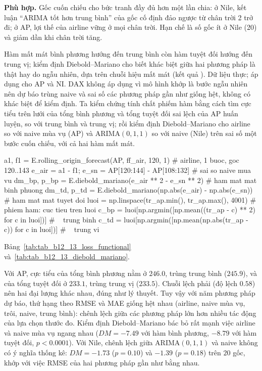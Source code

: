  \textbf{Phù hợp.} Gốc cuốn chiếu cho bức tranh đầy đủ hơn một lần chia: ở Nile, kết luận ``ARIMA tốt hơn trung bình'' của gốc cố định đảo ngược từ chân trời 2 trở đi; ở AP, lợi thế của airline vững ở mọi chân trời. Hạn chế là số gốc ít ở Nile (20) và giảm dần khi chân trời tăng.

 Hàm mất mát bình phương hướng đến trung bình còn hàm tuyệt đối hướng đến trung vị; kiểm định Diebold--Mariano cho biết khác biệt giữa hai phương pháp là thật hay do ngẫu nhiên, dựa trên chuỗi hiệu mất mát (kết quả ).
 Dữ liệu thực; áp dụng cho AP và NI. DAX không áp dụng vì mô hình khớp là bước ngẫu nhiên nên dự báo trùng naive và sai số các phương pháp gần như giống hệt, không có khác biệt để kiểm định. Ta kiểm chứng tính chất phiếm hàm bằng cách tìm cực tiểu trên lưới của tổng bình phương và tổng tuyệt đối sai lệch của AP huấn luyện, so với trung bình và trung vị; rồi kiểm định Diebold--Mariano cho airline so với naive mùa vụ (AP) và ARIMA$(0,1,1)$ so với naive (Nile) trên sai số một bước cuốn chiếu, với cả hai hàm mất mát.
\begin{codeblock}
a1, f1 = E.rolling_origin_forecast(AP, ff_air, 120, 1)          # airline, 1 buoc, goc 120..143
e_air = a1 - f1; e_sn = AP[120:144] - AP[108:132]               # sai so naive mua vu
dm_bp, p_bp = E.diebold_mariano(e_air ** 2 - e_sn ** 2)         # ham mat mat binh phuong
dm_td, p_td = E.diebold_mariano(np.abs(e_air) - np.abs(e_sn))   # ham mat mat tuyet doi
luoi = np.linspace(tr_ap.min(), tr_ap.max(), 4001)              # phiem ham: cuc tieu tren luoi
c_bp = luoi[np.argmin([np.mean((tr_ap - c) ** 2) for c in luoi])]      # ~ trung binh
c_td = luoi[np.argmin([np.mean(np.abs(tr_ap - c)) for c in luoi])]     # ~ trung vi
\end{codeblock}
 Bảng~\ref{tab:tab_b12_13_loss_functional} và~\ref{tab:tab_b12_13_diebold_mariano}.


 Với AP, cực tiểu của tổng bình phương nằm ở $246.0$, trùng trung bình ($245.9$), và của tổng tuyệt đối ở $233.1$, trùng trung vị ($233.5$). Chuỗi lệch phải (độ lệch $0.58$) nên hai đại lượng khác nhau, đúng như lý thuyết. Tuy vậy với năm phương pháp dự báo, thứ hạng theo RMSE và MAE giống hệt nhau (airline, naive mùa vụ, trôi, naive, trung bình): chênh lệch giữa các phương pháp lớn hơn nhiều tác động của lựa chọn thước đo. Kiểm định Diebold--Mariano bác bỏ rất mạnh việc airline và naive mùa vụ ngang nhau ($DM=-7.49$ với hàm bình phương, $-8.79$ với hàm tuyệt đối, $p<0.0001$). Với Nile, chênh lệch giữa ARIMA$(0,1,1)$ và naive không có ý nghĩa thống kê: $DM=-1.73$ ($p=0.10$) và $-1.39$ ($p=0.18$) trên $20$ gốc, khớp với việc RMSE của hai phương pháp gần như bằng nhau.

